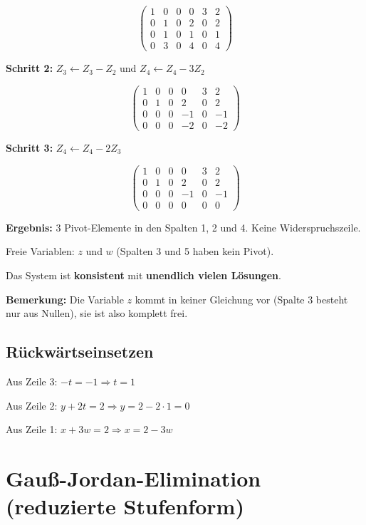 \documentclass[a4paper,12pt]{article}
\begin{document}
\[
\left(\begin{array}{ccccc|c}
1 & 0 & 0 & 0 & 3 & 2 \\
0 & 1 & 0 & 2 & 0 & 2 \\
0 & 1 & 0 & 1 & 0 & 1 \\
0 & 3 & 0 & 4 & 0 & 4
\end{array}\right)
\]

\textbf{Schritt 2:} $Z_3 \leftarrow Z_3 - Z_2$ und $Z_4 \leftarrow Z_4 - 3Z_2$

\[
\left(\begin{array}{ccccc|c}
1 & 0 & 0 & 0 & 3 & 2 \\
0 & 1 & 0 & 2 & 0 & 2 \\
0 & 0 & 0 & -1 & 0 & -1 \\
0 & 0 & 0 & -2 & 0 & -2
\end{array}\right)
\]

\textbf{Schritt 3:} $Z_4 \leftarrow Z_4 - 2Z_3$

\[
\left(\begin{array}{ccccc|c}
1 & 0 & 0 & 0 & 3 & 2 \\
0 & 1 & 0 & 2 & 0 & 2 \\
0 & 0 & 0 & -1 & 0 & -1 \\
0 & 0 & 0 & 0 & 0 & 0
\end{array}\right)
\]

\textbf{Ergebnis:} 3 Pivot-Elemente in den Spalten 1, 2 und 4. Keine Widerspruchszeile.

Freie Variablen: $z$ und $w$ (Spalten 3 und 5 haben kein Pivot).

Das System ist \textbf{konsistent} mit \textbf{unendlich vielen Lösungen}.

\textbf{Bemerkung:} Die Variable $z$ kommt in keiner Gleichung vor (Spalte 3 besteht nur aus Nullen), sie ist also komplett frei.

\subsection*{Rückwärtseinsetzen}

Aus Zeile 3: $-t = -1 \Rightarrow t = 1$

Aus Zeile 2: $y + 2t = 2 \Rightarrow y = 2 - 2 \cdot 1 = 0$

Aus Zeile 1: $x + 3w = 2 \Rightarrow x = 2 - 3w$

\section*{Gauß-Jordan-Elimination (reduzierte Stufenform)}
\end{document}
